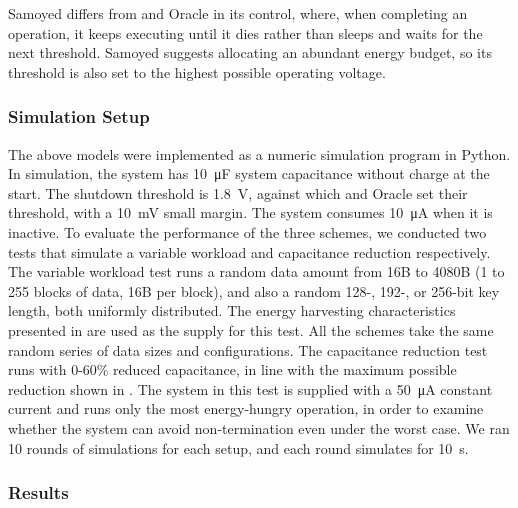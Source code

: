 Samoyed differs from \debs{} and \nn{} Oracle in its control, where, when completing an operation, it keeps executing until it dies rather than sleeps and waits for the next threshold.
Samoyed suggests allocating an abundant energy budget, so its threshold is also set to the highest possible operating voltage.


\subsubsection{Simulation Setup}

The above models were implemented as a numeric simulation program in Python.
In simulation, the system has \SI{10}{\micro\farad} system capacitance without charge at the start. 
The shutdown threshold is \SI{1.8}{\volt}, against which \debs{} and \nn{} Oracle set their threshold, with a \SI{10}{\milli\volt} small margin. 
The system consumes \SI{10}{\micro\ampere} when it is inactive.
To evaluate the performance of the three schemes, we conducted two tests that simulate a variable workload and capacitance reduction respectively.  
The variable workload test runs a random data amount from 16B to 4080B (1 to 255 blocks of data, 16B per block), and also a random 128-, 192-, or 256-bit key length, both uniformly distributed. 
The energy harvesting characteristics presented in  are used as the supply for this test. 
All the schemes take the same random series of data sizes and configurations.
The capacitance reduction test runs with 0-60\% reduced capacitance, in line with the maximum possible reduction shown in .
The system in this test is supplied with a \SI{50}{\micro\ampere} constant current and runs only the most energy-hungry operation, in order to examine whether the system can avoid non-termination even under the worst case.  
We ran 10 rounds of simulations for each setup, and each round simulates for \SI{10}{\second}. 

\subsubsection{Results}

% 
% 

